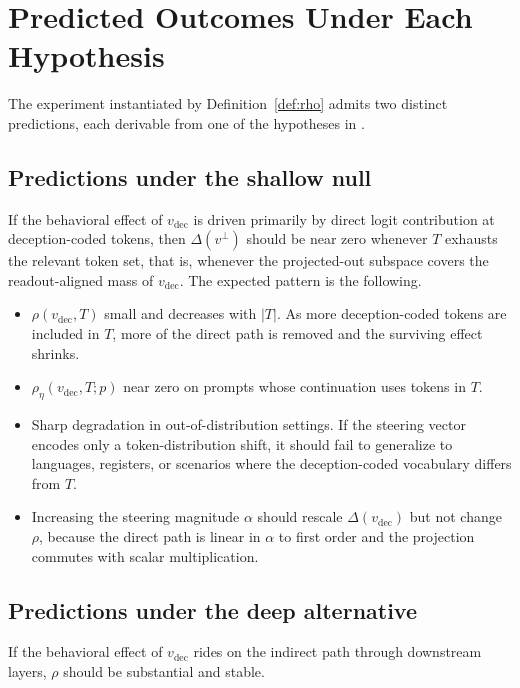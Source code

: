 \documentclass[11pt,letterpaper]{article}
\theoremstyle{plain}
\theoremstyle{definition}
\newcommand{\1}{\mathbf{1}}
\newcommand{\vdec}{v_{\text{dec}}}
\newcommand{\vperp}{v^{\perp}}
\begin{document}
\section{Predicted Outcomes Under Each Hypothesis}\label{sec:predictions}

The experiment instantiated by Definition~\ref{def:rho} admits two distinct predictions, each derivable from one of the hypotheses in .

\subsection{Predictions under the shallow null}

If the behavioral effect of $\vdec$ is driven primarily by direct logit contribution at deception-coded tokens, then $\Delta(\vperp)$ should be near zero whenever $T$ exhausts the relevant token set, that is, whenever the projected-out subspace covers the readout-aligned mass of $\vdec$. The expected pattern is the following.

\begin{itemize}[leftmargin=*]
\item $\rho(\vdec, T)$ small and decreases with $|T|$. As more deception-coded tokens are included in $T$, more of the direct path is removed and the surviving effect shrinks.
\item $\rho_\eta(\vdec, T; p)$ near zero on prompts whose continuation uses tokens in $T$.
\item Sharp degradation in out-of-distribution settings. If the steering vector encodes only a token-distribution shift, it should fail to generalize to languages, registers, or scenarios where the deception-coded vocabulary differs from $T$.
\item Increasing the steering magnitude $\alpha$ should rescale $\Delta(\vdec)$ but not change $\rho$, because the direct path is linear in $\alpha$ to first order and the projection commutes with scalar multiplication.
\end{itemize}

\subsection{Predictions under the deep alternative}

If the behavioral effect of $\vdec$ rides on the indirect path through downstream layers, $\rho$ should be substantial and stable.
\end{document}
